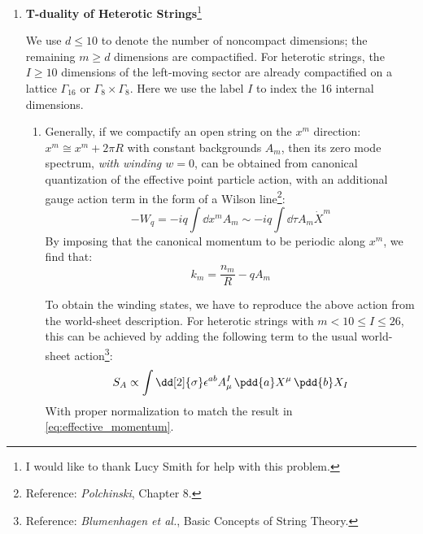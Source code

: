 \documentclass[a4paper,10pt]{article}
\begin{document}
\maketitle
\pagestyle{headings}
\thispagestyle{empty}


\begin{enumerate}

\item \textbf{T-duality of Heterotic Strings}\footnote{
		I would like to thank Lucy Smith for help with this problem. 
	}
	
	We use $d \le 10$ to denote the number of noncompact dimensions; the remaining $m \ge d$ dimensions are compactified. For heterotic strings, the $I\ge 10$ dimensions of the left-moving sector are already compactified on a lattice $\Gamma_{16}$ or $\Gamma_8\times \Gamma_8$. Here we use the label $I$ to index the 16 internal dimensions. 
	
	\begin{enumerate}
	\item Generally, if we compactify an open string on the $x^m$ direction: $x^m \cong x^m + 2\pi R$ with constant backgrounds $A_m$, then its zero mode spectrum, \textit{with winding $w = 0$}, can be obtained from canonical quantization of the effective point particle action, with an additional gauge action term in the form of a Wilson line\footnote{
		Reference: \textit{Polchinski}, Chapter 8. 
	}:
	\begin{equation}
		-W_q
		= -iq \int \dd{x^m} A_m
		\sim -iq \int \dd{\tau} A_m \dot{X}^m
	\end{equation}
	By imposing that the canonical momentum to be periodic along $x^m$, we find that:
	\begin{equation}
		k_m = \frac{n_m}{R} - q A_m
	\label{eq:effective_momentum}
	\end{equation}
	
	To obtain the winding states, we have to reproduce the above action from the world-sheet description. For heterotic strings with $m < 10 \le I \le 26$, this can be achieved by adding the following term to the usual world-sheet action\footnote{
		Reference: \textit{Blumenhagen et al.}, Basic Concepts of String Theory. 
	}:
	\begin{equation}
		S_A \propto \int \dd[2]{\sigma}
			\epsilon^{ab} A^I_\mu
			\,\pdd{a} X^\mu
			\,\pdd{b} X_I
	\end{equation}
	With proper normalization to match the result in \eqref{eq:effective_momentum}. 
	

\end{enumerate}
\end{enumerate}
\end{document}
